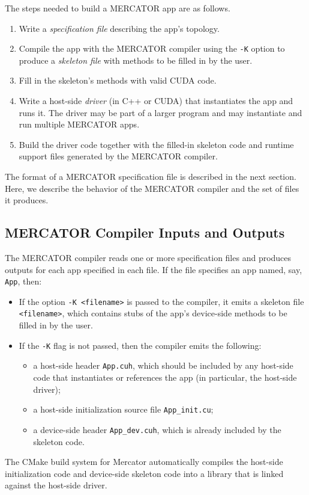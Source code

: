 \documentclass[11pt]{article}
\begin{document}
The steps needed to build a MERCATOR app are as follows.
\begin{enumerate}
\item Write a \emph{specification file} describing the app's topology.

\item Compile the app with the MERCATOR compiler using the \texttt{-K}
  option to produce a \emph{skeleton file} with methods to be filled
  in by the user.

\item Fill in the skeleton's methods with valid CUDA code.

\item Write a host-side \emph{driver} (in C++ or CUDA) that
  instantiates the app and runs it.  The driver may be part of
  a larger program and may instantiate and run multiple MERCATOR
  apps.

\item Build the driver code together with the filled-in skeleton
  code and runtime support files generated by the MERCATOR compiler.

\end{enumerate}
The format of a MERCATOR specification file is described in the next
section.  Here, we describe the behavior of the MERCATOR
compiler and the set of files it produces.

\subsection{MERCATOR Compiler Inputs and Outputs}

The MERCATOR compiler reads one or more specification files and
produces outputs for each app specified in each file.  If the file
specifies an app named, say, \texttt{App}, then:
\begin{itemize}

\item If the option \texttt{-K <filename>} is passed to the compiler,
  it emits a skeleton file \texttt{<filename>}, which contains stubs
  of the app's device-side methods to be filled in by the user.

\item If the \texttt{-K} flag is not passed, then the compiler emits
  the following:
\begin{itemize}

\item a host-side header \texttt{App.cuh}, which should be included
  by any host-side code that instantiates or references the app
  (in particular, the host-side driver);

\item a host-side initialization source file \texttt{App_init.cu};

\item a device-side header \texttt{App_dev.cuh}, which is already
  included by the skeleton code.

\end{itemize}

\end{itemize}
The CMake build system for Mercator automatically compiles the
host-side initialization code and device-side skeleton code into a
library that is linked against the host-side driver.
 
\end{document}
